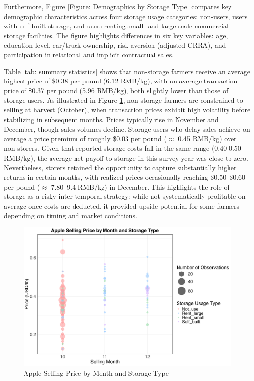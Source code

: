 Furthermore, Figure \ref{Figure: Demographics by Storage Type} compares key demographic characteristics across four storage usage categories: non-users, users with self-built storage, and users renting small- and large-scale commercial storage facilities. The figure highlights differences in six key variables: age, education level, car/truck ownership, risk aversion (adjusted CRRA), and participation in relational and implicit contractual sales.   

Table \ref{tab: summary statistics} shows that non-storage farmers receive an average highest price of \$0.38 per pound (6.12 RMB/kg), with an average transaction price of \$0.37 per pound (5.96 RMB/kg), both slightly lower than those of storage users. As illustrated in Figure \ref{Figure: selling price bubble}, non-storage farmers are constrained to selling at harvest (October), when transaction prices exhibit high volatility before stabilizing in subsequent months. Prices typically rise in November and December, though sales volumes decline. Storage users who delay sales achieve on average a price premium of roughly \$0.03 per pound ($\approx$ 0.45 RMB/kg) over non-storers. Given that reported storage costs fall in the same range (0.40-0.50 RMB/kg), the average net payoff to storage in this survey year was close to zero. Nevertheless, storers retained the opportunity to capture substantially higher returns in certain months, with realized prices occasionally reaching \$0.50--\$0.60 per pound ($\approx$ 7.80--9.4 RMB/kg) in December. This highlights the role of storage as a risky inter-temporal strategy: while not systematically profitable on average once costs are deducted, it provided upside potential for some farmers depending on timing and market conditions.


\begin{figure}[H]
\centering
\includegraphics[width=1.05\textwidth]{figures/apple_price_bubble_plot.png}
\caption{Apple Selling Price by Month and Storage Type}
\label{Figure: selling price bubble}
\end{figure}

